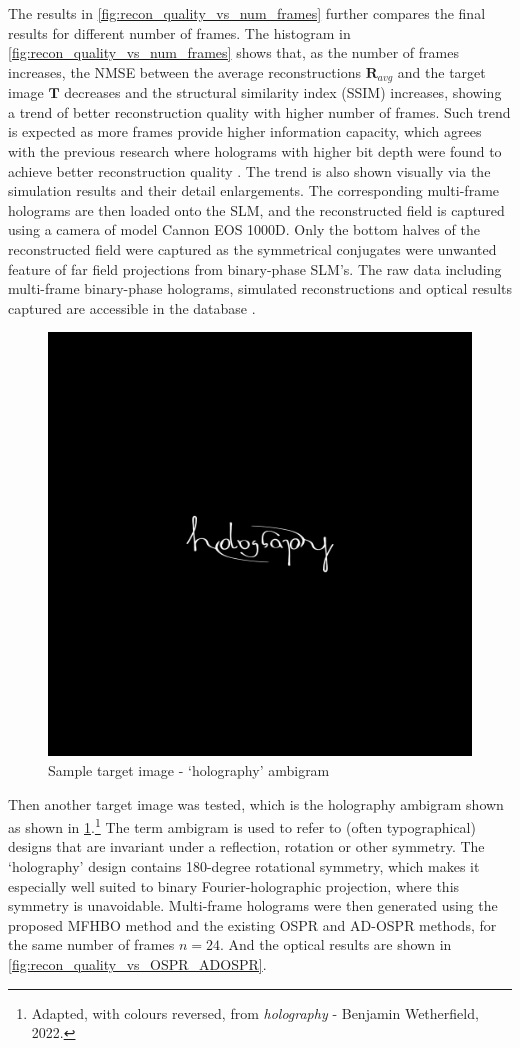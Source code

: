 	The results in \cref{fig:recon_quality_vs_num_frames} further compares the final results for different number of frames. The histogram in \cref{fig:recon_quality_vs_num_frames} shows that, as the number of frames increases, the NMSE between the average reconstructions $\textbf{R}_{avg}$ and the target image $\textbf{T}$ decreases and the structural similarity index (SSIM)\cite{Wang2004_SSIM} increases, showing a trend of better reconstruction quality with higher number of frames. Such trend is expected as more frames provide higher information capacity, which agrees with the previous research where holograms with higher bit depth were found to achieve better reconstruction quality \cite{Sha2024}. The trend is also shown visually via the simulation results and their detail enlargements. The corresponding multi-frame holograms are then loaded onto the SLM, and the reconstructed field is captured using a camera of model Cannon EOS 1000D. Only the bottom halves of the reconstructed field were captured as the symmetrical conjugates were unwanted feature of far field projections from binary-phase SLM's. The raw data including multi-frame binary-phase holograms, simulated reconstructions and optical results captured are accessible in the database \cite{research_data_MFHO2024}.

	\begin{figure}[h!t]
		\centering
		\includegraphics[width=0.5\linewidth]{holography_ambigram_smaller.png}
		\caption{Sample target image - `holography' ambigram}
		\label{fig:holography_ambigram_smaller}
	\end{figure}

	Then another target image was tested, which is the holography ambigram shown  as shown in \cref{fig:holography_ambigram_smaller}.\footnote{Adapted, with colours reversed, from  \emph{holography} - Benjamin Wetherfield, 2022.} The term ambigram is used to refer to (often typographical) designs that are invariant under a reflection, rotation or other symmetry. The `holography' design contains 180-degree rotational symmetry, which makes it especially well suited to binary Fourier-holographic projection, where this symmetry is unavoidable. Multi-frame holograms were then generated using the proposed MFHBO method and the existing OSPR and AD-OSPR methods, for the same number of frames $n=24$. And the optical results are shown in \cref{fig:recon_quality_vs_OSPR_ADOSPR}.

